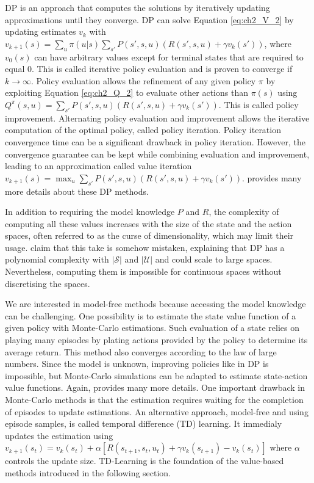 DP is an approach that computes the solutions by iteratively updating approximations until they converge.
DP can solve Equation \ref{eq:ch2_V_2} by updating estimates $v_k$ with $v_{k+1}(s) = \sum_{u} \pi(u|s) \sum_{s'} P(s', s, u) (R(s', s, u) + \gamma v_k(s'))$, where $v_0(s)$ can have arbitrary values except for terminal states that are required to equal 0.
This is called iterative policy evaluation and is proven to converge if $k\rightarrow\infty$.
Policy evaluation allows the refinement of any given policy $\pi$ by exploiting Equation \ref{eq:ch2_Q_2} to evaluate other actions than $\pi(s)$ using $Q^\pi(s, u) =  \sum_{s'} P(s', s, u) (R(s', s, u) + \gamma v_k(s'))$. 
This is called policy improvement.
Alternating policy evaluation and improvement allows the iterative computation of the optimal policy, called policy iteration.
Policy iteration convergence time can be a significant drawback in policy iteration.
However, the convergence guarantee can be kept while combining evaluation and improvement, leading to an approximation called value iteration $v_{k+1}(s) = \max_u \sum_{s'} P(s', s, u) (R(s', s, u) + \gamma v_k(s'))$.
\cite{sutton2018reinforcement} provides many more details about these DP methods.

In addition to requiring the model knowledge $P$ and $R$, the complexity of computing all these values increases with the size of the state and the action spaces, often referred to as the curse of dimensionality, which may limit their usage.
\cite{sutton2018reinforcement} claim that this take is somehow mistaken, explaining that DP has a polynomial complexity with $|\mathcal{S}|$ and $|\mathcal{U}|$ and could scale to large spaces.
Nevertheless, computing them is impossible for continuous spaces without discretising the spaces.

We are interested in model-free methods because accessing the model knowledge can be challenging.
One possibility is to estimate the state value function of a given policy with Monte-Carlo estimations.
Such evaluation of a state relies on playing many episodes by plating actions provided by the policy to determine its average return.
This method also converges according to the law of large numbers.
Since the model is unknown, improving policies like in DP is impossible, but Monte-Carlo simulations can be adapted to estimate state-action value functions.
Again, \citep{sutton2018reinforcement} provides many more details.
One important drawback in Monte-Carlo methods is that the estimation requires waiting for the completion of episodes to update estimations.
An alternative approach, model-free and using episode samples, is called temporal difference (TD) learning.
It immedialy updates the estimation using $v_{k+1}(s_t) = v_k(s_t) + \alpha [R(s_{t+1}, s_t, u_t) + \gamma v_k(s_{t+1}) - v_k(s_t)]$ where $\alpha$ controls the update size.
TD-Learning is the foundation of the value-based methods introduced in the following section.

